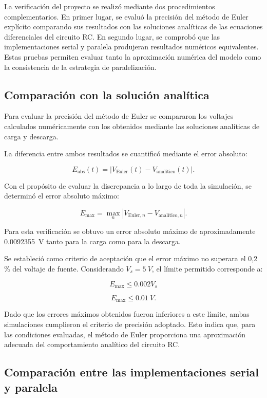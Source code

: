 \documentclass[11pt,a4paper]{article}
\begin{document}
La verificación del proyecto se realizó mediante dos procedimientos complementarios. En primer lugar, se evaluó la precisión del método de Euler explícito comparando sus resultados con las soluciones analíticas de las ecuaciones diferenciales del circuito RC. En segundo lugar, se comprobó que las implementaciones serial y paralela produjeran resultados numéricos equivalentes. Estas pruebas permiten evaluar tanto la aproximación numérica del modelo como la consistencia de la estrategia de paralelización.

\subsection{Comparación con la solución analítica}

Para evaluar la precisión del método de Euler se compararon los voltajes calculados numéricamente con los obtenidos mediante las soluciones analíticas de carga y descarga.

La diferencia entre ambos resultados se cuantificó mediante el error absoluto:

\[
E_{\mathrm{abs}}(t)=
\left|V_{\mathrm{Euler}}(t)
-V_{\mathrm{analítico}}(t)\right|.
\]

Con el propósito de evaluar la discrepancia a lo largo de toda la simulación, se determinó el error absoluto máximo:

\[
E_{\max}=
\max_n\left|
V_{\mathrm{Euler},n}
-V_{\mathrm{analítico},n}
\right|.
\]

Para esta verificación se obtuvo un error absoluto máximo de aproximadamente \SI{0.0092355}{V} tanto para la carga como para la descarga.

Se estableció como criterio de aceptación que el error máximo no superara el 0,2\,\% del voltaje de fuente. Considerando $V_s=\SI{5}{V}$, el límite permitido corresponde a:

\[
E_{\max}\leq 0.002V_s
\]

\[
\boxed{E_{\max}\leq \SI{0.01}{V}}.
\]

Dado que los errores máximos obtenidos fueron inferiores a este límite, ambas simulaciones cumplieron el criterio de precisión adoptado. Esto indica que, para las condiciones evaluadas, el método de Euler proporciona una aproximación adecuada del comportamiento analítico del circuito RC.

\subsection{Comparación entre las implementaciones serial y paralela}
\end{document}
